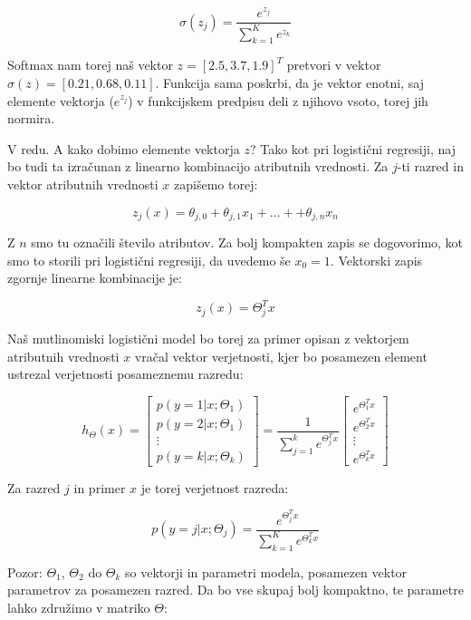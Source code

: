 $$\sigma(z_j) = \frac{e^{z_j}}{\sum_{k=1}^K e^{z_k}}$$

Softmax nam torej naš vektor $z=[2.5, 3.7, 1.9]^T$ pretvori v vektor
$\sigma(z)=[0.21, 0.68, 0.11]$. Funkcija sama poskrbi, da je vektor enotni, saj elemente vektorja ($e^{z_j}$) v funkcijskem predpisu deli z njihovo vsoto, torej jih normira.

V redu. A kako dobimo elemente vektorja $z$? Tako kot pri logistični regresiji, naj bo tudi ta izračunan z linearno kombinacijo atributnih vrednosti. Za $j$-ti razred in vektor atributnih vrednosti $x$ zapišemo torej:

$$ z_j(x)=\theta_{j,0}+\theta_{j,1} x_1 + \ldots + +\theta_{j,n} x_n $$

Z $n$ smo tu označili število atributov. Za bolj kompakten zapis se dogovorimo, kot smo to storili pri logistični regresiji, da uvedemo še $x_0=1$. Vektorski zapis zgornje linearne kombinacije je:

$$ z_j(x) = \Theta_j^T x $$

Naš mutlinomiski logistični model bo torej za primer opisan z vektorjem atributnih vrednosti $x$ vračal vektor verjetnosti, kjer bo posamezen element ustrezal verjetnosti posameznemu razredu:

\begin{equation}
  \nonumber
  h_\Theta(x) =
  \begin{bmatrix}
    p(y=1|x;\Theta_1) \\ p(y=2|x;\Theta_1) \\ \vdots \\ p(y=k|x;\Theta_k)
  \end{bmatrix}
  = \frac{1}{\sum_{j=1}^{k}e^{\Theta_j^T x}}
  \begin{bmatrix}
    e^{\Theta_1^T x} \\ e^{\Theta_2^T x} \\ \vdots \\ e^{\Theta_k^T x}
  \end{bmatrix}
\end{equation}

Za razred $j$ in primer $x$ je torej verjetnost razreda:

$$ p(y=j|x;\Theta_j)=\frac{e^{\Theta_j^T x}}{\sum_{k=1}^K e^{\Theta_k^T x}} $$

Pozor: $\Theta_1$, $\Theta_2$ do $\Theta_k$ so vektorji in parametri modela, posamezen vektor parametrov za posamezen razred. Da bo vse skupaj bolj kompaktno, te parametre lahko združimo v matriko $\Theta$:

\newcommand{\myrule}{\rule[.5ex]{2em}{0.4pt}}

